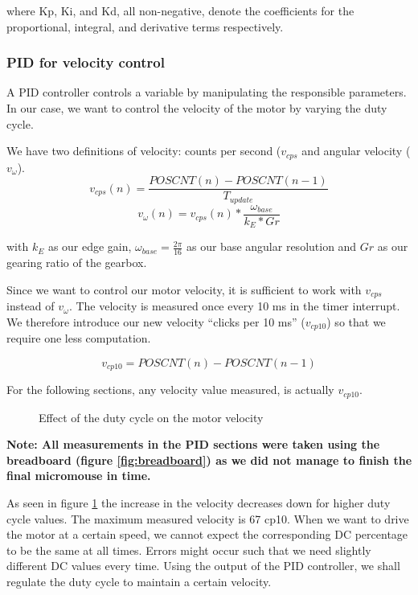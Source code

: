 where Kp, Ki, and Kd, all non-negative, denote the coefficients for the proportional, integral, and derivative terms respectively.

\subsubsection*{PID for velocity control}
A PID controller controls a variable by manipulating the responsible parameters. In our case, we want to control the velocity of the motor by varying the duty cycle. 

We have two definitions of velocity: counts per second ($v_{cps}$ and angular velocity ($v_\omega$).
$$v_{cps}(n) = \frac{POSCNT(n) - POSCNT(n-1)}{T_{update}}$$
$$v_{\omega}(n) = v_{cps}(n) * \frac{\omega_{base}}{k_{E}*Gr}$$

with $k_E$ as our edge gain, $\omega_{base} = \frac{2\pi}{16}$ as our base angular resolution and $Gr$ as our gearing ratio of the gearbox.

Since we want to control our motor velocity, it is sufficient to work with $v_{cps}$ instead of $v_{\omega}$. 
The velocity is measured once every 10 ms in the timer interrupt.
We therefore introduce our new velocity ``clicks per 10 ms'' ($v_{cp10}$) so that we require one less computation.

$$v_{cp10} = POSCNT(n) - POSCNT(n-1)$$

For the following sections, any velocity value measured, is actually $v_{cp10}$.

\begin{figure}
    \centering
{}
    \caption{Effect of the duty cycle on the motor velocity} \label{fig:DC_V}
\end{figure}

\textbf{Note: All measurements in the PID sections were taken using the breadboard (figure \ref{fig:breadboard}) as we did not manage to finish the final micromouse in time.}


As seen in figure \ref{fig:DC_V} the increase in the velocity decreases down for higher duty cycle values. The maximum measured velocity is 67 cp10. When we want to drive the motor at a certain speed, we cannot expect the corresponding DC percentage to be the same at all times. Errors might occur such that we need slightly different DC values every time.
Using the output of the PID controller, we shall regulate the duty cycle to maintain a certain velocity.

